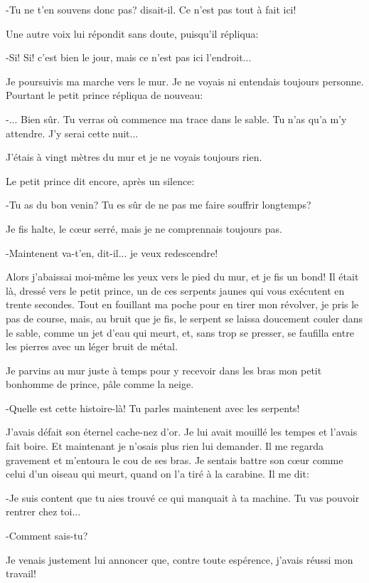 \documentclass{report}
\begin{document}
-Tu ne t'en souvens donc pas? disait-il. Ce n'est pas tout à fait ici!

Une autre voix lui répondit sans doute, puisqu'il répliqua:

-Si! Si! c'est bien le jour, mais ce n'est pas ici l'endroit...

Je poursuivis ma marche vers le mur. Je ne voyais ni entendais toujours personne. Pourtant le petit prince répliqua de nouveau:

-... Bien sûr. Tu verras où commence ma trace dans le sable. Tu n'as qu'a m'y attendre. J'y serai cette nuit...

J'étais à vingt mètres du mur et je ne voyais toujours rien.

Le petit prince dit encore, après un silence:

-Tu as du bon venin? Tu es sûr de ne pas me faire souffrir longtemps?

Je fis halte, le cœur serré, mais je ne comprennais toujours pas.

-Maintenent va-t'en, dit-il... je veux redescendre! 


Alors j'abaissai moi-même les yeux vers le pied du mur, et je fis un bond! Il était là, dressé vers le petit prince, un de ces serpents jaunes qui vous exécutent en trente secondes. Tout en fouillant ma poche pour en tirer mon révolver, je pris le pas de course, mais, au bruit que je fis, le serpent se laissa doucement couler dans le sable, comme un jet d'eau qui meurt, et, sans trop se presser, se faufilla entre les pierres avec un léger bruit de métal.

Je parvins au mur juste à temps pour y recevoir dans les bras mon petit bonhomme de prince, pâle comme la neige.

-Quelle est cette histoire-là! Tu parles maintenent avec les serpents!

J'avais défait son éternel cache-nez d'or. Je lui avait mouillé les tempes et l'avais fait boire. Et maintenant je n'osais plus rien lui demander. Il me regarda gravement et m'entoura le cou de ses bras. Je sentais battre son cœur comme celui d'un oiseau qui meurt, quand on l'a tiré à la carabine. Il me dit:

-Je suis content que tu aies trouvé ce qui manquait à ta machine. Tu vas pouvoir rentrer chez toi...

-Comment sais-tu?

Je venais justement lui annoncer que, contre toute espérence, j'avais réussi mon travail!
\end{document}
